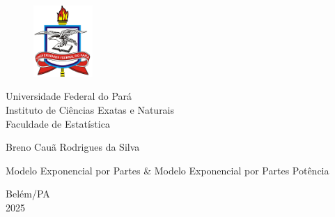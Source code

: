 \begin{titlepage}

\begin{center}

\begin{figure}
    \centering
    \includegraphics[width=0.2\textwidth]{IMAGES/UFPA_LOGO.png} \\
    \label{fig:LOGO_UFPA}
\end{figure}

\huge 
Universidade Federal do Pará \\
Instituto de Ciências Exatas e Naturais \\
Faculdade de Estatística

\vspace{3.0 cm}

{\Large Breno Cauã Rodrigues da Silva}

\vspace{3.0 cm}

{\Huge Modelo Exponencial por Partes \& Modelo Exponencial por Partes Potência}

\vspace{6.0 cm}
{\large
Belém/PA \\ 2025
}

\vfill

\end{center}

\end{titlepage}